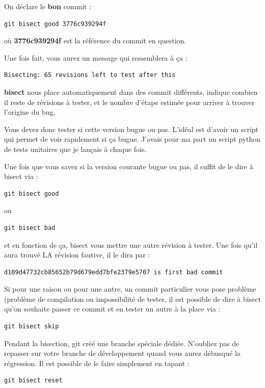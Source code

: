 \documentclass[a4paper,twoside]{article}
\begin{document}
On déclare le \textbf{bon} commit : 
\begin{verbatim}
git bisect good 3776c939294f
\end{verbatim}
où \textbf{3776c939294f} est la référence du commit en question. 

\bigskip

Une fois fait, vous aurez un message qui ressemblera à ça :
\begin{verbatim}
Bisecting: 65 revisions left to test after this
\end{verbatim}

\textbf{bisect} nous place automatiquement dans des commit différents, indique combien il reste de révisions à tester, et le nombre d'étape estimée pour arriver à trouver l'origine du bug. 

Vous devez donc tester si cette version bugue ou pas. L'idéal est d'avoir un script qui permet de voir rapidement si ça bugue. J'avais pour ma part un script python de tests unitaires que je lançais à chaque fois. 

Une fois que vous savez si la version courante bugue ou pas, il suffit de le dire à bisect via : 
\begin{verbatim}
git bisect good
\end{verbatim}
ou
\begin{verbatim}
git bisect bad
\end{verbatim}
et en fonction de ça, bisect vous mettre une autre révision à tester. Une fois qu'il aura trouvé LA révision fautive, il le dira par :
\begin{verbatim}
d109d47732cb85652b79d679edd7bfe2379e5707 is first bad commit
\end{verbatim}

\begin{attention}
Si pour une raison ou pour une autre, un commit particulier vous pose problème (problème de compilation ou impossibilité de tester, il est possible de dire à bisect qu'on souhaite passer ce commit et en tester un autre à la place via :
\begin{verbatim}
git bisect skip
\end{verbatim}
\end{attention}


\begin{important}
Pendant la bisection, git créé une branche spéciale dédiée. N’oubliez pas de repasser sur votre branche de développement quand vous aurez débusqué la régression. Il est possible de le faire simplement en tapant :
\begin{verbatim}
git bisect reset
\end{verbatim}
\end{important}
\end{document}
